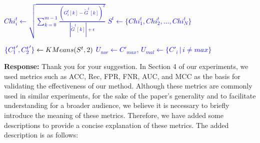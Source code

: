 \documentclass[a4paper,twoside,11pt,dvipsnames]{reviewresponse}
\begin{document}
\begin{algorithm}
\begin{algorithmic}[1]
{} 
    \State \textcolor{blue}{$Chi^t_i \gets \sqrt{\sum_{k=0}^{m-1}\frac{(G_i^t[k] - {\tilde G}^t[k])^2}{|{\tilde G}^t[k]| + \epsilon}}$}
\EndFor
\State \textcolor{blue}{$S^t \gets \{Chi^t_1, Chi^t_2, \ldots, Chi^t_N\}$} 

{} 
\State $\textcolor{blue}{\{{C^t_1}', {C^t_2}'\}} \gets KMeans(S^t, 2)$ 
\State \textcolor{blue}{$U_{nor} \gets C'_{max}$, $U_{mal} \gets \{C'_i \, | \, i \neq max\}$}

\end{algorithmic}
\end{algorithm}



\textbf{Response:} Thank you for your suggestion. In Section 4 of our experiments, we used metrics such as ACC, Rec, FPR, FNR, AUC, and MCC as the basis for validating the effectiveness of our method. Although these metrics are commonly used in similar experiments, for the sake of the paper's generality and to facilitate understanding for a broader audience, we believe it is necessary to briefly introduce the meaning of these metrics. Therefore, we have added some descriptions to provide a concise explanation of these metrics. The added description is as follows:
\end{document}
